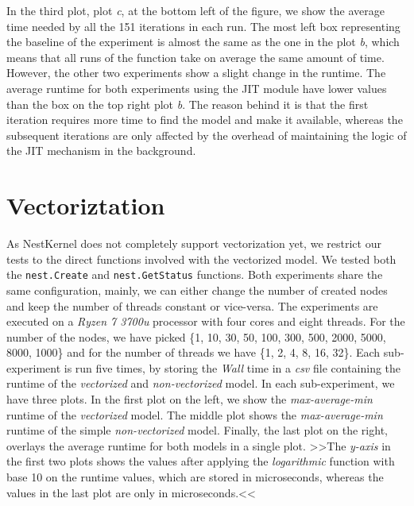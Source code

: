 In the third plot, plot \emph{c}, at the bottom left of the figure, we show the average time needed by all the 151 iterations in each run. The most left box representing the baseline of the experiment is almost the same as the one in the plot \emph{b}, which means that all runs of the function take on average the same amount of time. However, the other two experiments show a slight change in the runtime. The average runtime for both experiments using the JIT module have lower values than the box on the top right plot \emph{b}. The reason behind it is that the first iteration requires more time to find the model and make it available, whereas the subsequent iterations are only affected by the overhead of maintaining the logic of the JIT mechanism in the background.



\section{Vectoriztation}

As NestKernel does not completely support vectorization yet, we restrict our tests to the direct functions involved with the vectorized model. We tested both the \texttt{nest.Create} and \texttt{nest.GetStatus} functions. Both experiments share the same configuration, mainly, we can either change the number of created nodes and keep the number of threads constant or vice-versa. The experiments are executed on a \emph{Ryzen 7 3700u} processor with four cores and eight threads. 
For the number of the nodes, we have picked \{1, 10, 30, 50, 100, 300, 500, 2000, 5000, 8000, 1000\} and for the number of threads we have \{1, 2, 4, 8, 16, 32\}. Each sub-experiment is run five times, by storing the \emph{Wall} time in a \emph{csv} file containing the runtime of the \emph{vectorized} and \emph{non-vectorized} model. In each sub-experiment, we have three plots. In the first plot on the left, we show the \emph{max-average-min} runtime of the \emph{vectorized} model. The middle plot shows the \emph{max-average-min} runtime of the simple \emph{non-vectorized} model. Finally, the last plot on the right, overlays the average runtime for both models in a single plot. >>The \emph{y-axis} in the first two plots shows the values after applying the \emph{logarithmic} function with base 10 on the runtime values, which are stored in microseconds, whereas the values in the last plot are only in microseconds.<< 

